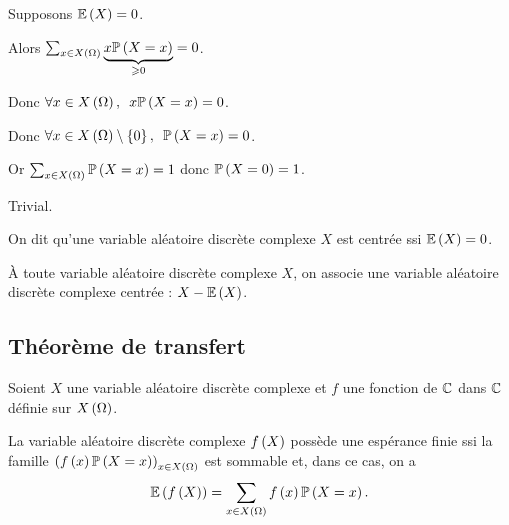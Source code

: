 \begin{dem}
\impdir

Supposons \(\operatorname{\mathbb{E}}\left(X\right)=0\).

Alors \(\sum_{x\in X\left(\Omega\right)}\underbrace{x\mathbb{P}\left(X=x\right)}_{\geqslant0}=0\).

Donc \(\quantifs{\forall x\in X\paren{\Omega}}x\proba{X=x}=0\).

Donc \(\quantifs{\forall x\in X\paren{\Omega}\excluant\accol{0}}\proba{X=x}=0\).

Or \(\sum_{x\in X\left(\Omega\right)}\mathbb{P}\left(X=x\right)=1\) donc \(\mathbb{P}\left(X=0\right)=1\).

\imprec

Trivial.
\end{dem}

\begin{defi}
On dit qu'une variable aléatoire discrète complexe \(X\) est centrée ssi \(\operatorname{\mathbb{E}}\left(X\right)=0\).
\end{defi}

À toute variable aléatoire discrète complexe \(X\), on associe une variable aléatoire discrète complexe centrée : \(X-\operatorname{\mathbb{E}}\left(X\right)\).

\subsection{Théorème de transfert}

\begin{theo}
Soient \(X\) une variable aléatoire discrète complexe et \(f\) une fonction de \(\mathbb{C}\) dans \(\mathbb{C}\) définie sur \(X\left(\Omega\right)\).

La variable aléatoire discrète complexe \(f\left(X\right)\) possède une espérance finie ssi la famille \(\left(f\left(x\right)\mathbb{P}\left(X=x\right)\right)_{x\in X\left(\Omega\right)}\) est sommable et, dans ce cas, on a \[\operatorname{\mathbb{E}}\left(f\left(X\right)\right)=\sum_{x\in X\left(\Omega\right)}f\left(x\right)\mathbb{P}\left(X=x\right).\]
\end{theo}


